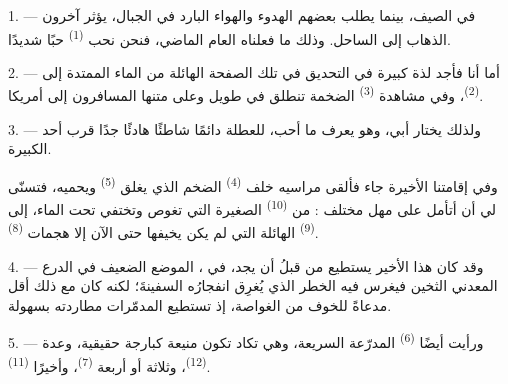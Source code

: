 %

\VUsaut{4.0mm}
\VUsaut{3.0mm}
\VUsaut{3.0mm}

1. --- في الصيف، بينما يطلب بعضهم الهدوء والهواء البارد في الجبال، يؤثر
آخرون الذهاب إلى الساحل. وذلك ما فعلناه العام الماضي، فنحن نحب
 \textsuperscript{(1)} حبًا شديدًا.

2. --- أما أنا فأجد لذة كبيرة في التحديق في تلك الصفحة الهائلة من الماء
الممتدة إلى  \textsuperscript{(2)}، وفي مشاهدة 
\textsuperscript{(3)} الضخمة تنطلق في  طويل وعلى متنها المسافرون
إلى أمريكا.

3. --- ولذلك يختار أبي، وهو يعرف ما أحب، للعطلة دائمًا شاطئًا هادئًا جدًا
قرب أحد  الكبيرة.

وفي إقامتنا الأخيرة جاء  فألقى مراسيه خلف  \textsuperscript{(4)} الضخم الذي يغلق 
\textsuperscript{(5)} ويحميه، فتسنّى لي أن أتأمل على مهل مختلف : من  \textsuperscript{(10)} الصغيرة التي تغوص وتختفي
تحت الماء، إلى  \textsuperscript{(9)} الهائلة التي لم يكن
يخيفها حتى الآن إلا هجمات  \textsuperscript{(8)}.

\VUsaut{3.0mm}
\VUsaut{3.0mm}

4. --- وقد كان هذا الأخير يستطيع من قبلُ أن يجد، في ،
الموضع الضعيف في الدرع المعدني الثخين فيغرس فيه  الخطر
الذي يُغرِق انفجارُه السفينةَ؛ لكنه كان مع ذلك أقل مدعاةً للخوف من
الغواصة، إذ تستطيع المدمّرات مطاردته بسهولة.

5. --- ورأيت أيضًا  \textsuperscript{(6)} المدرّعة السريعة،
وهي تكاد تكون منيعة كبارجة حقيقية، وعدة 
\textsuperscript{(12)}، وثلاثة أو أربعة  \textsuperscript{(7)}،
وأخيرًا  \textsuperscript{(11)}. 

